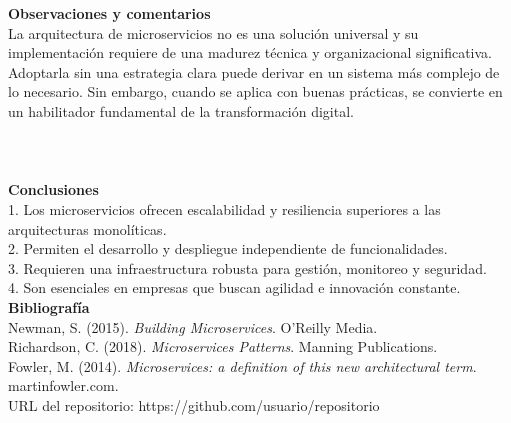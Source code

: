 \documentclass[12pt,letterpaper]{article}
\begin{document}
\textbf{Observaciones y comentarios} \\
La arquitectura de microservicios no es una solución universal y su implementación requiere de una madurez técnica y organizacional significativa. Adoptarla sin una estrategia clara puede derivar en un sistema más complejo de lo necesario. Sin embargo, cuando se aplica con buenas prácticas, se convierte en un habilitador fundamental de la transformación digital. \\
\\
\\
\\
\textbf{Conclusiones} \\
1. Los microservicios ofrecen escalabilidad y resiliencia superiores a las arquitecturas monolíticas. \\
2. Permiten el desarrollo y despliegue independiente de funcionalidades. \\
3. Requieren una infraestructura robusta para gestión, monitoreo y seguridad. \\
4. Son esenciales en empresas que buscan agilidad e innovación constante. \\

\textbf{Bibliografía} \\
Newman, S. (2015). \textit{Building Microservices}. O’Reilly Media. \\
Richardson, C. (2018). \textit{Microservices Patterns}. Manning Publications. \\
Fowler, M. (2014). \textit{Microservices: a definition of this new architectural term}. martinfowler.com. \\

URL del repositorio: https://github.com/usuario/repositorio 
\end{document}
